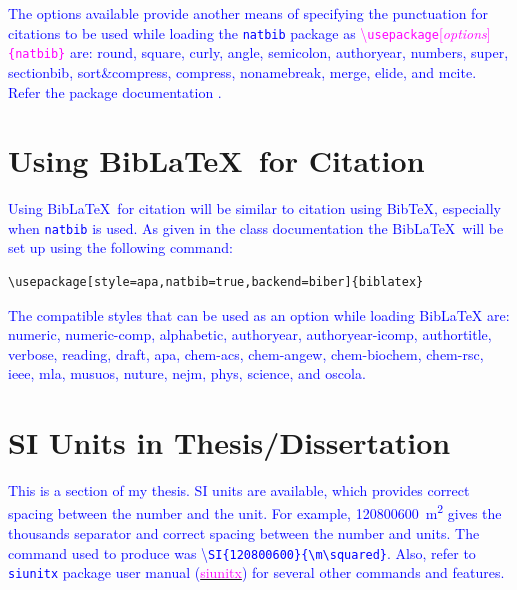 \documentclass[phd]{ndsu-thesis-2022}
\newcommand\italk[1]{\textcolor{blue}{#1}}  %
\newcommand\cmd[1]{\textbackslash\texttt{#1}}  %
\newcommand\vb[1]{\textcolor{blue}{\texttt{#1}}}%
\begin{document}
\italk{
The options available provide another means of specifying the punctuation
for citations to be used while loading the \texttt{natbib} package as \textcolor{magenta}{\cmd{usepackage}[\emph{options}]\texttt{\{natbib\}}} are: \textbullet\:round, \textbullet\:square, \textbullet\:curly, \textbullet\:angle, \textbullet\:semicolon, \textbullet\:authoryear, \textbullet\:numbers, \textbullet\:super, \textbullet\:sectionbib, \textbullet\:sort\&compress, \textbullet\:compress, \textbullet\:nonamebreak, \textbullet\:merge, \textbullet\:elide, and \textbullet\:mcite. Refer the package documentation \citep{daly2010natural}.  
}

\section{Using Bib\LaTeX\ for Citation}
\italk{Using Bib\LaTeX\ for citation will be similar to citation using BibTeX, especially when \vb{natbib} is used. As given in the class documentation the Bib\LaTeX\ will be set up using the following command:
}

\vspace{2ex}
{\singlespacing
\begin{verbatim}
\usepackage[style=apa,natbib=true,backend=biber]{biblatex}
\end{verbatim}
}

\italk{The compatible styles that can be used as an option while loading Bib\LaTeX\/ are: \textbullet\:numeric, \textbullet\:numeric-comp, \textbullet\:alphabetic, \textbullet\:authoryear, \textbullet\:authoryear-icomp, \textbullet\:authortitle, \textbullet\:verbose, \textbullet\:reading, \textbullet\:draft, \textbullet\:apa, \textbullet\:chem-acs, \textbullet\:chem-angew, \textbullet\:chem-biochem, \textbullet\:chem-rsc, \textbullet\:ieee, \textbullet\:mla, \textbullet\:musuos, \textbullet\:nuture, \textbullet\:nejm, \textbullet\:phys, \textbullet\:science, and \textbullet\:oscola.}



\section{SI Units in Thesis/Dissertation}
\italk{This is a section of my thesis. SI units are available, which provides correct spacing between the number and the unit. For example, \SI{120800600}{\m\squared} gives the thousands separator and correct spacing between the number and units. The command used to produce was \textbackslash\texttt{SI\{120800600\}\{\textbackslash m\textbackslash squared\}}.  Also, refer to \texttt{siunitx} package user manual (\href{https://mirror.mwt.me/ctan/macros/latex/contrib/siunitx/siunitx.pdf}{\textcolor{magenta}{siunitx}}) for several other commands and features.} 
\end{document}
